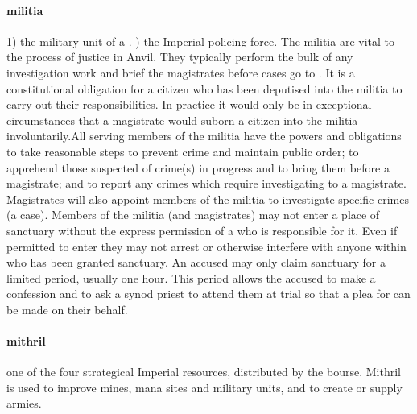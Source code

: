\paragraph{militia} 1) the military unit of a . ) the Imperial policing force. The militia are vital to the process of justice in Anvil. They typically perform the bulk of any investigation work and brief the magistrates before cases go to . It is a constitutional obligation for a citizen who has been deputised into the militia to carry out their responsibilities. In practice it would only be in exceptional circumstances that a magistrate would suborn a citizen into the militia involuntarily.\localpar All serving members of the militia have the powers and obligations to take reasonable steps to prevent crime and maintain public order; to apprehend those suspected of crime(s) in progress and to bring them before a magistrate; and to report any crimes which require investigating to a magistrate. Magistrates will also appoint members of the militia to investigate specific crimes (a case). \localpar Members of the militia (and magistrates) may not enter a place of sanctuary without the express permission of a  who is responsible for it. Even if permitted to enter they may not arrest or otherwise interfere with anyone within who has been granted sanctuary. An accused may only claim sanctuary for a limited period, usually one hour. This period allows the accused to make a confession and to ask a synod priest to attend them at trial so that a plea for  can be made on their behalf.
\paragraph{mithril} one of the four strategical Imperial resources, distributed by the bourse. Mithril is used to improve mines, mana sites and military units, and to create or supply armies.
